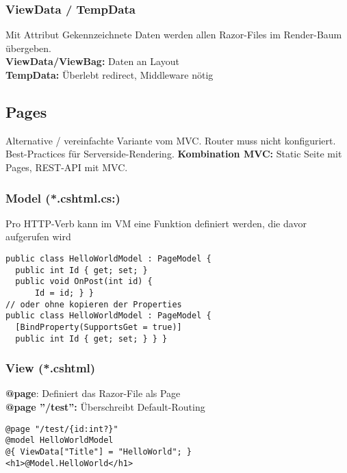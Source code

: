\subsubsection{ViewData / TempData}
Mit Attribut Gekennzeichnete Daten werden allen Razor-Files im Render-Baum übergeben.\\
\textbf{ViewData/ViewBag:} Daten an Layout\\
\textbf{TempData:} Überlebt redirect, Middleware nötig

\subsection{Pages}
Alternative / vereinfachte Variante vom MVC. Router muss nicht konfiguriert. Best-Practices für Serverside-Rendering.
\textbf{Kombination MVC:} Static Seite mit Pages, REST-API mit MVC.


\subsubsection{Model (*.cshtml.cs:)}
Pro HTTP-Verb kann im VM eine Funktion definiert werden, die davor aufgerufen wird
\begin{lstlisting}[style=CSharp]
public class HelloWorldModel : PageModel {
  public int Id { get; set; }
  public void OnPost(int id) {
      Id = id; } }
// oder ohne kopieren der Properties
public class HelloWorldModel : PageModel {
  [BindProperty(SupportsGet = true)]
  public int Id { get; set; } } }
\end{lstlisting}

\subsubsection{View (*.cshtml)}
\textbf{@page}: Definiert das Razor-File als Page\\
\textbf{@page ''/test'':} Überschreibt Default-Routing
\begin{lstlisting}[style=CSharp]
@page "/test/{id:int?}"
@model HelloWorldModel
@{ ViewData["Title"] = "HelloWorld"; }
<h1>@Model.HelloWorld</h1>
\end{lstlisting}

